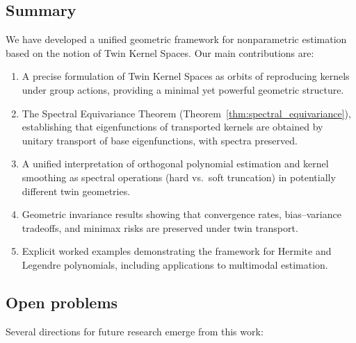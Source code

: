 \documentclass[11pt,a4paper]{article}
\begin{document}
\subsection{Summary}

We have developed a unified geometric framework for nonparametric estimation based on the notion of Twin Kernel Spaces. Our main contributions are:

\begin{enumerate}
\item A precise formulation of Twin Kernel Spaces as orbits of reproducing kernels under group actions, providing a minimal yet powerful geometric structure.

\item The Spectral Equivariance Theorem (Theorem~\ref{thm:spectral_equivariance}), establishing that eigenfunctions of transported kernels are obtained by unitary transport of base eigenfunctions, with spectra preserved.

\item A unified interpretation of orthogonal polynomial estimation and kernel smoothing as spectral operations (hard vs.\ soft truncation) in potentially different twin geometries.

\item Geometric invariance results showing that convergence rates, bias--variance tradeoffs, and minimax risks are preserved under twin transport.

\item Explicit worked examples demonstrating the framework for Hermite and Legendre polynomials, including applications to multimodal estimation.
\end{enumerate}

\subsection{Open problems}

Several directions for future research emerge from this work:
\end{document}
